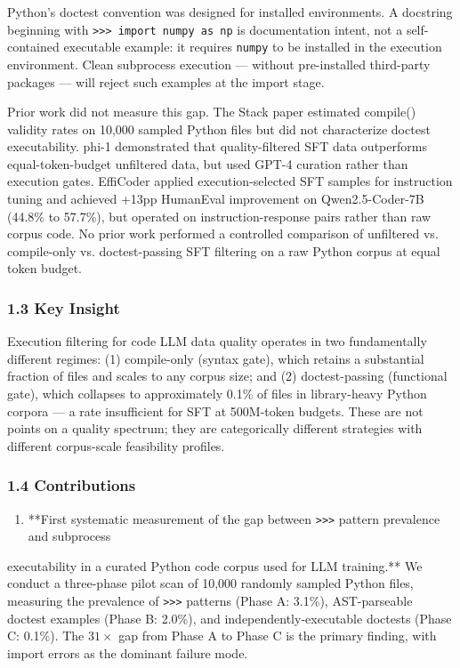 Python's doctest convention was designed for installed environments. A docstring beginning
with \texttt{>>> import numpy as np} is documentation intent, not a self-contained executable
example: it requires \texttt{numpy} to be installed in the execution environment. Clean subprocess
execution --- without pre-installed third-party packages --- will reject such examples at the
import stage.

Prior work did not measure this gap. The Stack paper estimated compile() validity rates
on 10,000 sampled Python files \citep{Kocetkov2022} but did not characterize doctest
executability. phi-1 \citep{Gunasekar2023} demonstrated that quality-filtered SFT data
outperforms equal-token-budget unfiltered data, but used GPT-4 curation rather than
execution gates. EffiCoder \citep{Zeng2024} applied execution-selected SFT samples for
instruction tuning and achieved +13pp HumanEval improvement on Qwen2.5-Coder-7B (44.8\%
to 57.7\%), but operated on instruction-response pairs rather than raw corpus code. No prior
work performed a controlled comparison of unfiltered vs. compile-only vs. doctest-passing
SFT filtering on a raw Python corpus at equal token budget.

\subsubsection{1.3 Key Insight}

Execution filtering for code LLM data quality operates in two fundamentally different
regimes: (1) compile-only (syntax gate), which retains a substantial fraction of files and
scales to any corpus size; and (2) doctest-passing (functional gate), which collapses to
approximately 0.1\% of files in library-heavy Python corpora --- a rate insufficient for SFT
at 500M-token budgets. These are not points on a quality spectrum; they are categorically
different strategies with different corpus-scale feasibility profiles.

\subsubsection{1.4 Contributions}

\begin{enumerate}
\item **First systematic measurement of the gap between \texttt{>>>} pattern prevalence and subprocess
\end{enumerate}
   executability in a curated Python code corpus used for LLM training.**
   We conduct a three-phase pilot scan of 10,000 randomly sampled Python files, measuring
   the prevalence of \texttt{>>>} patterns (Phase A: 3.1\%), AST-parseable doctest examples
   (Phase B: 2.0\%), and independently-executable doctests (Phase C: 0.1\%). The $31\times$ gap
   from Phase A to Phase C is the primary finding, with import errors as the dominant
   failure mode.

